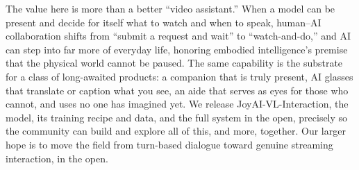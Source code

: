 \documentclass{llmxive}
\begin{document}

The value here is more than a better ``video assistant.'' When a model can be present and decide for itself what to watch and when to speak, human--AI collaboration shifts from ``submit a request and wait'' to ``watch-and-do,'' and AI can step into far more of everyday life, honoring embodied intelligence's premise that the physical world cannot be paused. The same capability is the substrate for a class of long-awaited products: a companion that is truly present, AI glasses that translate or caption what you see, an aide that serves as eyes for those who cannot, and uses no one has imagined yet. We release  JoyAI-VL-Interaction, the model, its training recipe and data, and the full system in the open, precisely so the community can build and explore all of this, and more, together. Our larger hope is to move the field from turn-based dialogue toward genuine streaming interaction, in the open.
\end{document}
